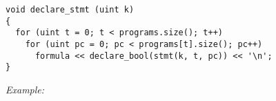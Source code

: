 







\begin{lstlisting}[style=c++]
void declare_stmt (uint k)
{
  for (uint t = 0; t < programs.size(); t++)
    for (uint pc = 0; pc < programs[t].size(); pc++)
      formula << declare_bool(stmt(k, t, pc)) << '\n';
}
\end{lstlisting}

\newpage

\noindent
\emph{Example:} 

